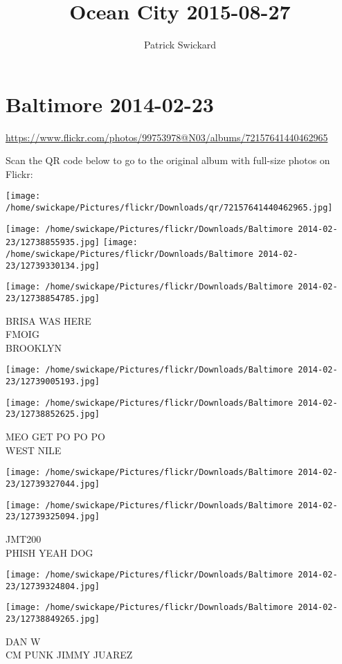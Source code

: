 \documentclass[10pt,letterpaper]{article}
\title{Ocean City 2015-08-27}
\author{Patrick Swickard}
\date{}
\begin{document}
\section*{Baltimore 2014-02-23}

\url{https://www.flickr.com/photos/99753978@N03/albums/72157641440462965}

Scan the QR code below to go to the original album with full-size photos on Flickr:

\texttt{[image: /home/swickape/Pictures/flickr/Downloads/qr/72157641440462965.jpg]}
\pagebreak

\texttt{[image: /home/swickape/Pictures/flickr/Downloads/Baltimore 2014-02-23/12738855935.jpg]}
\texttt{[image: /home/swickape/Pictures/flickr/Downloads/Baltimore 2014-02-23/12739330134.jpg]}

\texttt{[image: /home/swickape/Pictures/flickr/Downloads/Baltimore 2014-02-23/12738854785.jpg]}

BRISA WAS HERE\\
FMOIG\\
BROOKLYN
\pagebreak

\texttt{[image: /home/swickape/Pictures/flickr/Downloads/Baltimore 2014-02-23/12739005193.jpg]}

\vspace{0.25in}
\texttt{[image: /home/swickape/Pictures/flickr/Downloads/Baltimore 2014-02-23/12738852625.jpg]}

MEO GET PO PO PO\\
WEST NILE
\pagebreak

\texttt{[image: /home/swickape/Pictures/flickr/Downloads/Baltimore 2014-02-23/12739327044.jpg]}

\vspace{0.25in}
\texttt{[image: /home/swickape/Pictures/flickr/Downloads/Baltimore 2014-02-23/12739325094.jpg]}

JMT200\\
PHISH YEAH DOG
\pagebreak

\texttt{[image: /home/swickape/Pictures/flickr/Downloads/Baltimore 2014-02-23/12739324804.jpg]}

\vspace{0.25in}
\texttt{[image: /home/swickape/Pictures/flickr/Downloads/Baltimore 2014-02-23/12738849265.jpg]}

DAN W\\
CM PUNK JIMMY JUAREZ
\pagebreak
\end{document}
